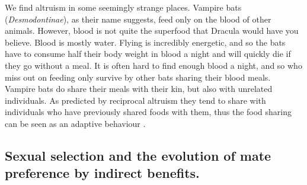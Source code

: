 We find altruism in some seemingly strange places. Vampire bats ({\it Desmodontinae}), as their name suggests, feed only on the blood of other animals. 
However, blood is not quite the superfood that Dracula would have you
believe. Blood is mostly water. Flying is incredibly energetic, and
so the bats have to consume half their body weight in blood a night and
will quickly die if they go without a meal. It is often hard to find
enough blood a night, and so who miss out on feeding only survive by
other bats sharing their blood meals. Vampire bats do share their
meals with their kin, but also with unrelated individuals. As
predicted by reciprocal altruism they tend to share with individuals
who have previously shared foods with them, thus the food sharing can be
seen as an adaptive behaviour \cite{wilkinson1984reciprocal,carter2013food}.  










\subsection{Sexual selection and the evolution of mate preference by indirect benefits. }


